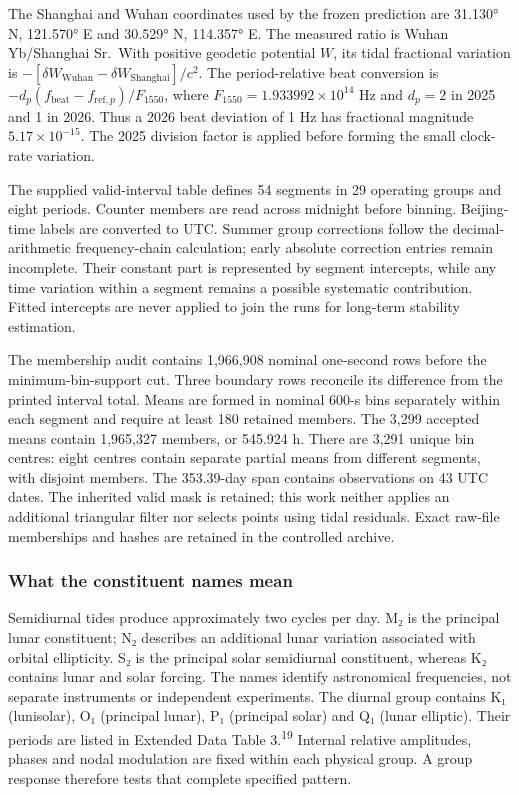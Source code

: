\documentclass[
  10pt,
  a4paper,
]{article}
\begin{document}
The Shanghai and Wuhan coordinates used by the frozen prediction are
31.130° N, 121.570° E and 30.529° N, 114.357° E. The measured ratio is
Wuhan Yb/Shanghai Sr.~With positive geodetic potential \(W\), its tidal
fractional variation is
\(-[\delta W_{\mathrm{Wuhan}}-\delta W_{\mathrm{Shanghai}}]/c^2\). The
period-relative beat conversion is
\(-d_p(f_{\mathrm{beat}}-f_{{\mathrm{ref}},p})/F_{1550}\), where
\(F_{1550}=1.933992\times10^{14}\) Hz and \(d_p=2\) in 2025 and 1 in
2026. Thus a 2026 beat deviation of 1 Hz has fractional magnitude
\(5.17\times10^{-15}\). The 2025 division factor is applied before
forming the small clock-rate variation.

The supplied valid-interval table defines 54 segments in 29 operating
groups and eight periods. Counter members are read across midnight
before binning. Beijing-time labels are converted to UTC. Summer group
corrections follow the decimal-arithmetic frequency-chain calculation;
early absolute correction entries remain incomplete. Their constant part
is represented by segment intercepts, while any time variation within a
segment remains a possible systematic contribution. Fitted intercepts
are never applied to join the runs for long-term stability estimation.

The membership audit contains 1,966,908 nominal one-second rows before
the minimum-bin-support cut. Three boundary rows reconcile its
difference from the printed interval total. Means are formed in nominal
600-s bins separately within each segment and require at least 180
retained members. The 3,299 accepted means contain 1,965,327 members, or
545.924 h. There are 3,291 unique bin centres: eight centres contain
separate partial means from different segments, with disjoint members.
The 353.39-day span contains observations on 43 UTC dates. The inherited
valid mask is retained; this work neither applies an additional
triangular filter nor selects points using tidal residuals. Exact
raw-file memberships and hashes are retained in the controlled archive.

\hypertarget{what-the-constituent-names-mean}{%
\subsubsection{What the constituent names
mean}\label{what-the-constituent-names-mean}}

Semidiurnal tides produce approximately two cycles per day. M₂ is the
principal lunar constituent; N₂ describes an additional lunar variation
associated with orbital ellipticity. S₂ is the principal solar
semidiurnal constituent, whereas K₂ contains lunar and solar forcing.
The names identify astronomical frequencies, not separate instruments or
independent experiments. The diurnal group contains K₁ (lunisolar), O₁
(principal lunar), P₁ (principal solar) and Q₁ (lunar elliptic). Their
periods are listed in Extended Data Table 3.\textsuperscript{19}
Internal relative amplitudes, phases and nodal modulation are fixed
within each physical group. A group response therefore tests that
complete specified pattern.
\end{document}
